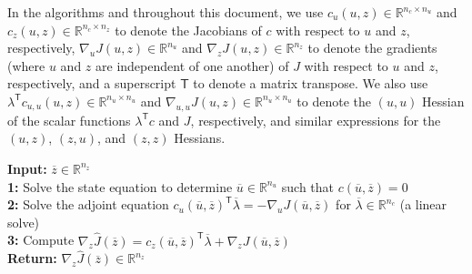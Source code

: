 \documentclass{article}
\def\R{{\mathbb R}}
\newcommand{\trp}{^{\mathsf{T}}}
\begin{document}
In the algorithms and throughout this document, we use $c_u(u,z)\in\R^{n_{c}\times n_{u}}$ and $c_z(u,z)\in\R^{n_{c}\times n_{z}}$ to denote the Jacobians of $c$ with respect to $u$ and $z$, respectively, $\nabla_u J(u, z)\in\R^{n_{u}}$ and $\nabla_z J(u, z)\in\R^{n_{z}}$ to denote the gradients (where $u$ and $z$ are independent of one another) of $J$ with respect to $u$ and $z$, respectively, and a superscript $\mathsf{T}$ to denote a matrix transpose.
We also use $\lambda\trp c_{u,u}(u,z) \in \R^{n_{u}\times n_{u}}$ and $\nabla_{u,u} J(u,z)\in\R^{n_{u}\times n_{u}}$ to denote the $(u,u)$ Hessian of the scalar functions $\lambda\trp c$ and $J$, respectively, and similar expressions for the $(u,z)$, $(z,u)$, and $(z,z)$ Hessians.

\begin{algorithm}[H]
    \caption{Adjoint-based gradient calculation}
    \label{alg:adjoint_gradient}
    \textbf{Input: } $\overline{z}\in\R^{n_{z}}$\\
    \textbf{1: } Solve the state equation to determine $\overline{u}\in\R^{n_{u}}$ such that $c(\overline{u},\overline{z})=0$\\
    \textbf{2: } Solve the adjoint equation $c_u(\overline{u},\overline{z})\trp \overline{\lambda} = - \nabla_u J(\overline{u},\overline{z})$ for $\overline{\lambda}\in\R^{n_{c}}$ (a linear solve) \\
    \textbf{3: } Compute $\nabla_z \hat{J}(\overline{z}) = c_z(\overline{u},\overline{z})\trp \overline{\lambda} + \nabla_z J(\overline{u},\overline{z})$ \\
    \textbf{Return: } $\nabla_z \hat{J}(\overline{z}) \in \R^{n_{z}}$
\end{algorithm}
\end{document}
